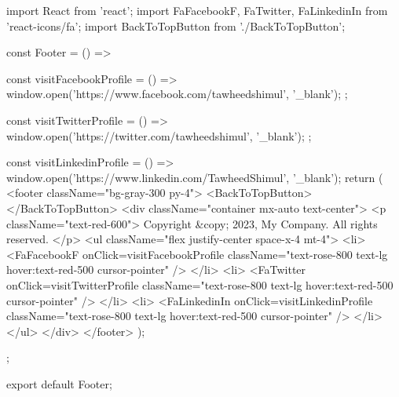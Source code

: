 import React from 'react';
import { FaFacebookF, FaTwitter, FaLinkedinIn } from 'react-icons/fa';
import BackToTopButton from './BackToTopButton';


const Footer = () => {
  const visitFacebookProfile = () => {
    window.open('https://www.facebook.com/tawheedshimul', '_blank');
  };

  const visitTwitterProfile = () => {
    window.open('https://twitter.com/tawheedshimul', '_blank');
  };

  const visitLinkedinProfile = () => {
    window.open('https://www.linkedin.com/TawheedShimul', '_blank');
  }
  return (
    <footer className="bg-gray-300 py-4">
      <BackToTopButton></BackToTopButton>
      <div className="container mx-auto text-center">
        <p className="text-red-600">
          Copyright &copy; 2023, My Company. All rights reserved.
        </p>
        <ul className="flex justify-center space-x-4 mt-4">
          <li>
          <FaFacebookF onClick={visitFacebookProfile} className="text-rose-800 text-lg hover:text-red-500 cursor-pointer" />
          </li>
          <li>
          <FaTwitter onClick={visitTwitterProfile} className="text-rose-800 text-lg hover:text-red-500 cursor-pointer" />
          </li>
          <li>
          <FaLinkedinIn onClick={visitLinkedinProfile} className="text-rose-800 text-lg hover:text-red-500 cursor-pointer" />
          </li>
        </ul>
      </div>
    </footer>
  );
};

export default Footer;